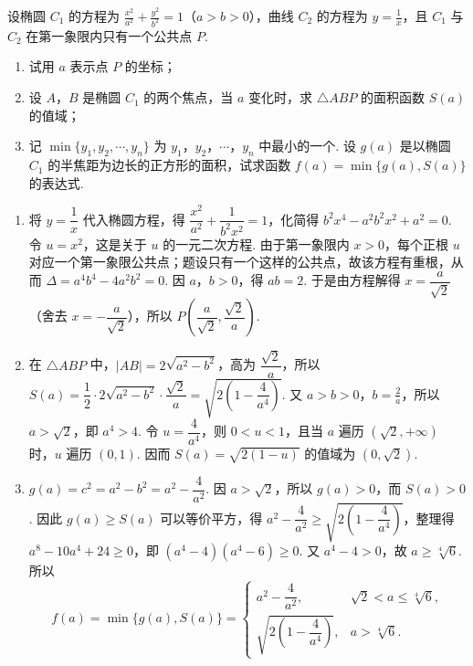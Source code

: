 \documentclass[UTF8,a4paper,oneside,11pt]{ctexbook}
\begin{document}
\begin{problem}
设椭圆 \(C_1\) 的方程为 \(\frac{x^2}{a^2} + \frac{y^2}{b^2} = 1\)（\(a > b > 0\)），曲线 \(C_2\) 的方程为 \(y = \frac{1}{x}\)，且 \(C_1\) 与 \(C_2\) 在第一象限内只有一个公共点 \(P\).

\begin{enumerate}
\item 试用 \(a\) 表示点 \(P\) 的坐标；
\item 设 \(A\)，\(B\) 是椭圆 \(C_1\) 的两个焦点，当 \(a\) 变化时，求 \(\triangle ABP\) 的面积函数 \(S(a)\) 的值域；
\item 记 \(\min\{y_1, y_2, \cdots, y_n\}\) 为 \(y_1\)，\(y_2\)，\(\cdots\)，\(y_n\) 中最小的一个. 设 \(g(a)\) 是以椭圆 \(C_1\) 的半焦距为边长的正方形的面积，试求函数 \(f(a) = \min\{g(a), S(a)\}\) 的表达式.
\end{enumerate}
\end{problem}

\begin{solution}
\begin{enumerate}
\item 将 \(y=\dfrac{1}{x}\) 代入椭圆方程，得 \(\dfrac{x^2}{a^2}+\dfrac{1}{b^2x^2}=1\)，化简得 \(b^2x^4-a^2b^2x^2+a^2=0\). 令 \(u=x^2\)，这是关于 \(u\) 的一元二次方程. 由于第一象限内 \(x>0\)，每个正根 \(u\) 对应一个第一象限公共点；题设只有一个这样的公共点，故该方程有重根，从而 \(\Delta=a^4b^4-4a^2b^2=0\). 因 \(a\)，\(b>0\)，得 \(ab=2\). 于是由方程解得 \(x=\dfrac{a}{\sqrt2}\)（舍去 \(x=-\dfrac{a}{\sqrt2}\)），所以 \(P\left(\dfrac{a}{\sqrt2},\dfrac{\sqrt2}{a}\right)\).

\item 在 \(\triangle ABP\) 中，\(|AB|=2\sqrt{a^2-b^2}\)，高为 \(\dfrac{\sqrt2}{a}\)，所以 \(S(a)=\dfrac12\cdot2\sqrt{a^2-b^2}\cdot\dfrac{\sqrt2}{a}=\sqrt{2\left(1-\dfrac{4}{a^4}\right)}\).
又 \(a>b>0\)，\(b=\frac{2}{a}\)，所以 \(a>\sqrt2\)，即 \(a^4>4\). 令 \(u=\dfrac4{a^4}\)，则 \(0<u<1\)，且当 \(a\) 遍历 \((\sqrt2,+\infty)\) 时，\(u\) 遍历 \((0,1)\). 因而 \(S(a)=\sqrt{2(1-u)}\) 的值域为 \((0,\sqrt2)\).

\item
\(g(a)=c^2=a^2-b^2=a^2-\dfrac{4}{a^2}\). 因 \(a>\sqrt2\)，所以 \(g(a)>0\)，而 \(S(a)>0\). 因此 \(g(a)\ge S(a)\) 可以等价平方，得 \(a^2-\dfrac{4}{a^2}\ge\sqrt{2\left(1-\dfrac{4}{a^4}\right)}\)，整理得 \(a^8-10a^4+24\ge0\)，即 \((a^4-4)(a^4-6)\ge0\). 又 \(a^4-4>0\)，故 \(a\ge\sqrt[4]{6}\).
所以
\[
f(a)=\min\{g(a),S(a)\}=
\begin{cases}
a^2-\dfrac{4}{a^2}, & \sqrt2<a\le\sqrt[4]{6},\\
\sqrt{2\left(1-\dfrac{4}{a^4}\right)}, & a>\sqrt[4]{6}.
\end{cases}
\]
\end{enumerate}
\end{solution}

\end{document}
